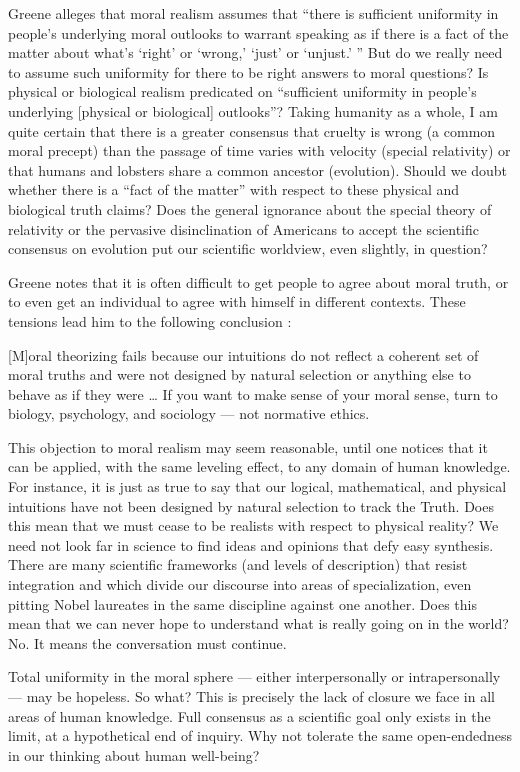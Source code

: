 \documentclass[a4paper,14pt]{extarticle}
\begin{document}
Greene alleges that moral realism assumes that ``there is sufficient uniformity in people's underlying moral outlooks to warrant speaking as if there is a fact of the matter about what's `right' or `wrong,' `just' or `unjust.' ''
But do we really need to assume such uniformity for there to be right answers to moral questions?
Is physical or biological realism predicated on ``sufficient uniformity in people's underlying [physical or biological] outlooks''?
Taking humanity as a whole, I am quite certain that there is a greater consensus that cruelty is wrong (a common moral precept) than the passage of time varies with velocity (special relativity) or that humans and lobsters share a common ancestor (evolution).
Should we doubt whether there is a ``fact of the matter'' with respect to these physical and biological truth claims?
Does the general ignorance about the special theory of relativity or the pervasive disinclination of Americans to accept the scientific consensus on evolution put our scientific worldview, even slightly, in question?

Greene notes that it is often difficult to get people to agree about moral truth, or to even get an individual to agree with himself in different contexts.
These tensions lead him to the following conclusion :

[M]oral theorizing fails because our intuitions do not reflect a coherent set of moral truths and were not designed by natural selection or anything else to behave as if they were \dots
If you want to make sense of your moral sense, turn to biology, psychology, and sociology --- not normative ethics.

This objection to moral realism may seem reasonable, until one notices that it can be applied, with the same leveling effect, to any domain of human knowledge.
For instance, it is just as true to say that our logical, mathematical, and physical intuitions have not been designed by natural selection to track the Truth.
Does this mean that we must cease to be realists with respect to physical reality?
We need not look far in science to find ideas and opinions that defy easy synthesis.
There are many scientific frameworks (and levels of description) that resist integration and which divide our discourse into areas of specialization, even pitting Nobel laureates in the same discipline against one another.
Does this mean that we can never hope to understand what is really going on in the world?
No.
It means the conversation must continue.

Total uniformity in the moral sphere --- either interpersonally or intrapersonally --- may be hopeless.
So what?
This is precisely the lack of closure we face in all areas of human knowledge.
Full consensus as a scientific goal only exists in the limit, at a hypothetical end of inquiry.
Why not tolerate the same open-endedness in our thinking about human well-being?
\end{document}

